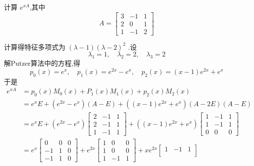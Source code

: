 \documentclass[lang=cn,12pt,color=green,fontset=none]{elegantbook}
\begin{document}
\begin{example}
    计算 \(  e^{xA}  \),其中 \[
    A= \begin{bmatrix} 
        3&-1&1\\ 
         2&0&1\\ 
          1&-1&2 
    \end{bmatrix} 
    \] 
\end{example}
\begin{solution}
    计算得特征多项式为 \(  \left(  \lambda -1 \right)\left( \lambda-2 \right)^{2}    \) .设 \[
    \lambda_1=1,\quad \lambda_2=2,\quad \lambda_3=2
    \]解Putzer算法中的方程,得 \[
    p_0\left( x \right)=e^{x},\quad p_1\left( x \right)=e^{2x}-e^{x},\quad p_2\left( x \right)= \left( x-1 \right)e^{2x}+ e^{x}  
    \]于是 \[
    \begin{aligned}
        e^{xA}& = p_0\left( x \right)M_0\left( x \right)+ P_1\left( x \right)M_1\left( x \right)+ p_2\left( x \right)M_2\left( x \right)    \\ 
         & =  e^{x}E+  \left( e^{2x}-e^{x} \right)\left(  A-E\right)+ \left( \left( x-1 \right)e^{2x}+ e^{x}  \right)\left( A-2E \right)  \left( A-E \right)   \\ 
          & = e^{x}E+  \left( e^{2x} -e^{x}\right)\begin{bmatrix} 
              2&-1&1\\ 
               2&-1&1\\ 
                1&-1&1 
          \end{bmatrix}+ 
          \left( \left( x-1 \right)e^{2x}+ e^{x}  \right)\begin{bmatrix} 
              1&-1&1\\ 
               1&-1&1\\ 
                0&0&0 
          \end{bmatrix}    \\ 
           & = e^{x} \begin{bmatrix} 
                0&0& 0\\ 
                 -1&1&0\\ 
                  -1&1&0
           \end{bmatrix}+  e^{2x} \begin{bmatrix} 
               1&0&0\\ 
                1&0&0\\ 
                 1&-1&1 
           \end{bmatrix}+ xe^{2x} \begin{bmatrix} 
               1&-1&1\\ 

\end{bmatrix}
\end{aligned}\]
\end{solution}
\end{document}
